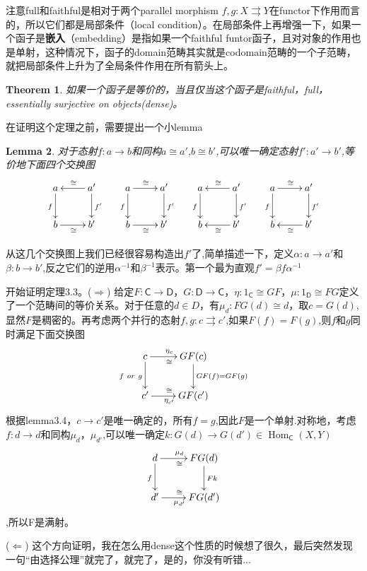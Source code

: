 \documentclass{article}
\newtheorem{theorem}{Theorem}[section]
\newtheorem{lemma}[theorem]{Lemma}
\newcommand{\tbf}{\textbf}
\newcommand*{\cat}[1]{\textsf{#1}\xspace}
\newcommand{\al}{\alpha}
\newcommand{\be}{\beta}
\newcommand*{\xfunc}[4]{{#2}\colon{#3}{#1}{#4}}
\newcommand*{\func}[3]{\xfunc{\to}{#1}{#2}{#3}}
\newcommand*{\pfunc}[3]{\xfunc{\rightrightarrows}{#1}{#2}{#3}}
\newcommand*{\isom}[3]{\xfunc{\cong}{#1}{#2}{#3}}
\DeclareMathOperator{\Hom}{Hom}
\begin{document}
注意full和faithful是相对于两个parallel morphism $f,g:X \rightrightarrows Y$在functor下作用而言的，所以它们都是局部条件（local condition）。在局部条件上再增强一下，如果一个函子是\tbf{嵌入}（embedding）是指如果一个faithful funtor函子，且对对象的作用也是单射，这种情况下，函子的domain范畴其实就是codomain范畴的一个子范畴，就把局部条件上升为了全局条件作用在所有箭头上。

\begin{theorem}
\rm 如果一个函子是等价的，当且仅当这个函子是faithful，full，essentially surjective on objects(dense)。
\end{theorem}

在证明这个定理之前，需要提出一个小lemma

\begin{lemma}
\rm 对于态射$\func{f}{a}{b}$和同构$a \cong a'$,$b \cong b'$,可以唯一确定态射$\func{f'}{a'}{b'}$,等价地下面四个交换图
\[\xymatrix{
	a\ar[d]_{f} & a'\ar[l]_{\cong}\ar[d]^{f'} &
	a\ar[d]_{f}\ar[r]^{\cong} & a'\ar[d]^{f'} &
	a\ar[d]_{f} & a'\ar[l]_{\cong}\ar[d]^{f'} &
	a\ar[d]_{f}\ar[r]^{\cong} & a'\ar[d]^{f'} \\
	b\ar[r]_{\cong} & b' &
	b\ar[r]_{\cong} & b' &
	b & b'\ar[l]^{\cong} &
	b & b'\ar[l]^{\cong}
	}\]
\end{lemma}
从这几个交换图上我们已经很容易构造出$f'$了,简单描述一下，定义$\func{\al}{a}{a'}$和$\func{\be}{b}{b'}$,反之它们的逆用$\al^{-1}$和$\be^{-1}$表示。第一个最为直观$f'=\be f \al^{-1}$

开始证明定理3.3。($\Longrightarrow$) 给定$\func{F}{\cat{C}}{\cat{D}}$，$\func{G}{\cat{D}}{\cat{C}}$，$\isom{\eta}{1_{\cat{C}}}{GF}$，$\isom{\mu}{1_{\cat{D}}}{FG}$定义了一个范畴间的等价关系。对于任意的$d \in D$，有$\isom{\mu_d}{FG(d)}{d}$，取$c=G(d)$,显然$F$是稠密的。再考虑两个并行的态射$\pfunc{f,g}{c}{c'}$,如果$F(f)=F(g)$,则$f$和$g$同时满足下面交换图
\[\xymatrix{
	c\ar[d]_{f\ or\ g}\ar[r]_{\cong}^{\eta_c} & GF(c)\ar[d]^{GF(f)=GF(g)}\\
	c'\ar[r]_{\eta_{c'}}^{\cong} & GF(c')
	}\]	根据lemma3.4，$c \rightarrow c'$是唯一确定的，所有$f=g$,因此$F$是一个单射.对称地，考虑$\func{f}{d}{d}$和同构$\mu_{d}$，$\mu_{d'}$,可以唯一确定$\func{k}{G(d)}{G(d')} \in \Hom_\cat{C}(X,Y) $\[\xymatrix{
	d\ar[d]_{f}\ar[r]_{\cong}^{\mu_d} & FG(d)\ar[d]^{Fk}\\
	d'\ar[r]_{\mu_{d'}}^{\cong} & FG(d')
	}\],所以F是满射。
	
($\Longleftarrow$) 这个方向证明，我在怎么用dense这个性质的时候想了很久，最后突然发现一句“由选择公理”就完了，就完了，是的，你没有听错...
\end{document}
